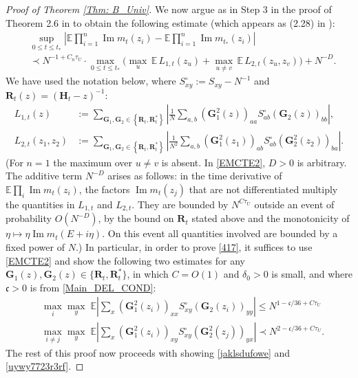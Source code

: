 \begin{proof}[Proof of Theorem \ref{Thm: B_Univ}]
We now argue as in Step 3 in the proof of Theorem 2.6 in \cite{YY_25} to obtain the following estimate (which appears as (2.28) in \cite{YY_25}):
%
\begin{align}\nonumber
& \sup _{0 \leq t \leq t_*}\left|\mathbb{E} \prod_{i=1}^n \operatorname{Im} m_t(z_i)-\mathbb{E} \prod_{i=1}^n \operatorname{Im} m_{t_*}(z_i)\right|
\\\label{EMCTE2}
&\prec  N^{-1+C_{n}\tau_{U}}\cdot  \max_{0\le t\le t_*}\Big(\max_{u}\,\mathbb{E}\, L_{1, t}(z_u)  + \max_{u\ne v}\,\mathbb{E}\,  L_{2, t}(z_u, z_v)\Big)+N^{-D}.
\end{align}
%
We have used the notation below, where $S_{xy}^{\circ}:=S_{xy}-N^{-1}$ and $\mathbf{R}_{t}(z)=({\mathbf{H}}_{t}-z)^{-1}$:
%
\begin{align*}
L_{1, t}(z) & :=\sum_{\mathbf{G}_1, \mathbf{G}_2 \in\left\{{\mathbf{R}}_t, {\mathbf{R}}_t^*\right\}}\left|\frac{1}{N} \sum_{a, b}\left(\mathbf{G}_1^2(z)\right)_{a a} S_{a b}^{\circ}\left(\mathbf{G}_2(z)\right)_{b b}\right|, \\
L_{2, t}\left(z_1, z_2\right) & :=\sum_{\mathbf{G}_1, \mathbf{G}_2 \in\left\{{\mathbf{R}}_t, {\mathbf{R}}_t^*\right\}}\left|\frac{1}{N^2} \sum_{a, b}\left(\mathbf{G}_1^2\left(z_1\right)\right)_{a b} S_{a b}^{\circ}\left(\mathbf{G}_2^2\left(z_2\right)\right)_{b a}\right|.
\end{align*}
%
(For $n=1$ the maximum over $u\neq v$ is absent. In \eqref{EMCTE2}, $D>0$ is arbitrary. The additive term $N^{-D}$ arises as follows: in the time derivative of $\mathbb{E}\prod_{i}\operatorname{Im} m_t(z_i)$, the factors $\operatorname{Im} m_t(z_j)$ that are not differentiated multiply the quantities in $L_{1,t}$ and $L_{2,t}$. They are bounded by $N^{C\tau_{U}}$ outside an event of probability $O(N^{-D})$, by the bound on $\mathbf{R}_{t}$ stated above and the monotonicity of $\eta\mapsto\eta\operatorname{Im} m_{t}(E+i\eta)$. On this event all quantities involved are bounded by a fixed power of $N$.)
%
In particular, in order to prove \eqref{417}, it suffices to use \eqref{EMCTE2} and show the following two estimates for any $\mathbf{G}_{1}(z),\mathbf{G}_{2}(z)\in\{\mathbf{R}_{t},\mathbf{R}_{t}^{*}\}$, in which $C=O(1)$ and $\delta_{0}>0$ is small, and where $\mathfrak{c}>0$ is from \eqref{Main_DEL_COND}:
%
\begin{align}\label{jaklsdufowe}
  & \max_i\max_y\; \mathbb E\left| \sum_{ x}\left(\mathbf{G}_1^2(z_i)\right)_{x x} S_{x y}^{\circ}\left(\mathbf{G}_2(z_i)\right)_{yy}\right|\le N^{1-\mathfrak c/36+C\tau_{U}} \\\label{uywy7723r3rf}
 & \max_{i\ne j}\max_y\;\mathbb E\left|  \sum_{  x}\left(\mathbf{G}_1^2\left(z_i\right)\right)_{xy} S_{x y}^{\circ}\left(\mathbf{G}_2^2\left(z_j\right)\right)_{yx}\right| \prec N^{2-\mathfrak c/36+C\tau_{U}}.
\end{align}
%
The rest of this proof now proceeds with showing \eqref{jaklsdufowe} and \eqref{uywy7723r3rf}.

\end{proof}
